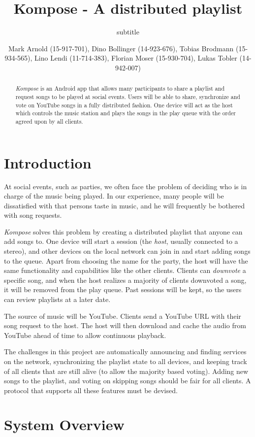\documentclass{report}
\title{Kompose - A distributed playlist}
\subtitle{subtitle}
\author{
%
%
    \alignauthor \normalsize{Mark Arnold (15-917-701), Dino Bollinger (14-923-676), Tobias Brodmann (15-934-565), Lino Lendi (11-714-383), Florian Moser (15-930-704), Lukas Tobler (14-942-007)}\\
	\email{\normalsize{arnomark@student.ethz.ch, bdino@student.ethz.ch, brotobia@student.ethz.ch, llendi@student.ethz.ch, moserfl@studen.ethz.ch, lutobler@student.ethz.ch}}
}
\begin{document}
\maketitle

\begin{abstract}
\emph{Kompose} is an Android app that allows many participants to share a playlist and
request songs to be played at social events. Users will be able to share,
synchronize and vote on YouTube songs in a fully distributed fashion. One device will
act as the host which controls the music station and plays the songs in the play queue
with the order agreed upon by all clients.
\end{abstract}

\section{Introduction}
At social events, such as parties, we often face the problem of deciding who is
in charge of the music being played. In our experience, many people will be
dissatisfied with that persons taste in music, and he will frequently be
bothered with song requests.

\emph{Kompose} solves this problem by creating a distributed playlist that anyone
can add songs to. One device will start a session (the \emph{host}, usually connected
to a stereo), and other devices on the local network can join in and start
adding songs to the queue.  Apart from choosing the name for the party,
the host will have the same functionality and capabilities like the other clients.
Clients can \emph{downvote} a specific song, and when the host realizes
a majority of clients downvoted a song, it will be removed from the play queue.  
Past sessions will be kept, so the users can review playlists at a later date.

The source of music will be YouTube. Clients send a YouTube URL with
their song request to the host. The host will then download and cache the
audio from YouTube ahead of time to allow continuous playback.

The challenges in this project are automatically announcing and finding
services on the network, synchronizing the playlist state to all devices,
and keeping track of all clients that are still alive (to allow the majority based voting). 
Adding new songs to the playlist, and voting on skipping songs should be fair 
for all clients. A protocol that supports all these features must be devised.

\section{System Overview}
\end{document}
